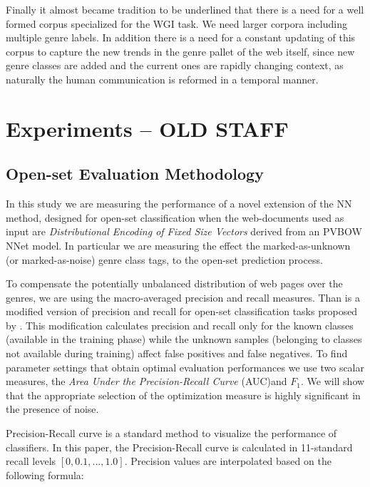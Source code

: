 Finally it almost became tradition to be underlined that there is a need for a well formed corpus specialized for the WGI task. We need larger corpora including multiple genre labels. In addition there is a need for a constant updating of this corpus to capture the new trends in the genre pallet of the web itself, since new genre classes are added and the current ones are rapidly changing context, as naturally the human communication is reformed in a temporal manner.




\section{Experiments -- OLD STAFF}\label{chap:word_embeddings:sec:experimental_setup}

\subsection{Open-set Evaluation Methodology}
In this study we are measuring the performance of a novel extension of the NN method, designed for open-set classification when the web-documents used as input are \textit{Distributional Encoding of Fixed Size Vectors} derived from an PVBOW NNet model. In particular we are measuring the effect the marked-as-unknown (or marked-as-noise) genre class tags, to the open-set prediction process.

To compensate the potentially unbalanced distribution of web pages over the genres, we are using the macro-averaged precision and recall measures. Than is a modified version of precision and recall for open-set classification tasks proposed by \parencite{mendesjunior2016}. This modification calculates precision and recall only for the known classes (available in the training phase) while the unknown samples (belonging to classes not available during training) affect false positives and false negatives. To find parameter settings that obtain optimal evaluation performances we use two scalar measures, the \textit{Area Under the Precision-Recall Curve} (AUC)and $F_{1}$. We will show that the appropriate selection of the optimization measure is highly significant in the presence of noise.

Precision-Recall curve is a standard method to visualize the performance of classifiers. In this paper, the Precision-Recall curve is calculated in 11-standard recall levels $[0,0.1,...,1.0]$. Precision values are interpolated based on the following formula:

